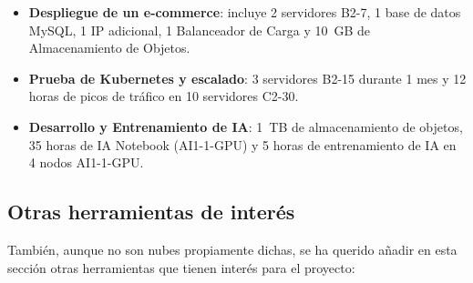 \begin{itemize}
	\item \textbf{Despliegue de un e-commerce}: incluye 2 servidores B2-7, 1 base de datos MySQL, 1 IP adicional, 1 Balanceador de Carga y 10~GB de Almacenamiento de Objetos.
	\item \textbf{Prueba de Kubernetes y escalado}: 3 servidores B2-15 durante 1 mes y 12 horas de picos de tráfico en 10 servidores C2-30.
	\item \textbf{Desarrollo y Entrenamiento de IA}: 1~TB de almacenamiento de objetos, 35 horas de IA Notebook (AI1-1-GPU) y 5 horas de entrenamiento de IA en 4 nodos AI1-1-GPU.
\end{itemize}


\subsection{Otras herramientas de interés}
\label{sec:EstudiosNubesOtrasHerramientas}

También, aunque no son nubes propiamente dichas, se ha querido añadir en esta sección otras herramientas que tienen interés para el proyecto:

